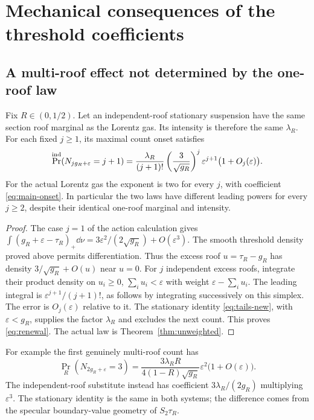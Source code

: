 \section{Mechanical consequences of the threshold coefficients}
\label{sec:consequences}
\subsection{A multi-roof effect not determined by the one-roof law}
\begin{corollary}\label{cor:nonrenewal}
Fix $R\in(0,1/2)$. Let an independent-roof stationary suspension have
the same section roof marginal as the Lorentz gas. Its intensity is
therefore the same $\lambda_R$. For each fixed $j\ge1$, its maximal
count onset satisfies
\begin{equation}\label{eq:renewal}
 \Pr^{\rm ind}(N_{jg_R+\varepsilon}=j+1)
 =\frac{\lambda_R}{(j+1)!}
       \left(\frac3{\sqrt{g_R}}\right)^j
       \varepsilon^{j+1}\bigl(1+O_j(\varepsilon)\bigr).
\end{equation}
For the actual Lorentz gas the exponent is two for every $j$, with
coefficient \eqref{eq:main-onset}. In particular the two laws have
different leading powers for every $j\ge2$, despite their identical
one-roof marginal and intensity.
\end{corollary}
\begin{proof}
The case $j=1$ of the action calculation gives
$\int(g_R+\varepsilon-\tau_R)_+\dd\nu
=3\varepsilon^2/(2\sqrt{g_R})+O(\varepsilon^3)$.
The smooth threshold density proved above permits differentiation.
Thus the excess roof $u=\tau_R-g_R$ has density
$3/\sqrt{g_R}+O(u)$ near $u=0$.
For $j$ independent excess roofs, integrate their product density on
$u_i\ge0$, $\sum_i u_i<\varepsilon$ with weight
$\varepsilon-\sum_i u_i$. The leading integral is
$\varepsilon^{j+1}/(j+1)!$, as follows by integrating successively
on this simplex. The error is $O_j(\varepsilon)$ relative to it.
The stationary identity \eqref{eq:tails-new}, with
$\varepsilon<g_R$, supplies the factor $\lambda_R$ and excludes the
next count. This proves \eqref{eq:renewal}. The actual law is
Theorem~\ref{thm:unweighted}.
\end{proof}

For example the first genuinely multi-roof count has
\begin{equation}\label{eq:three-hit}
 \Pr_R(N_{2g_R+\varepsilon}=3)
 =\frac{3\lambda_R R}{4(1-R)\sqrt{g_R}}
       \varepsilon^2\bigl(1+O(\varepsilon)\bigr).
\end{equation}
The independent-roof substitute instead has coefficient
$3\lambda_R/(2g_R)$ multiplying $\varepsilon^3$.
The stationary identity is the same in both systems; the difference
comes from the specular boundary-value geometry of $S_2\tau_R$.

